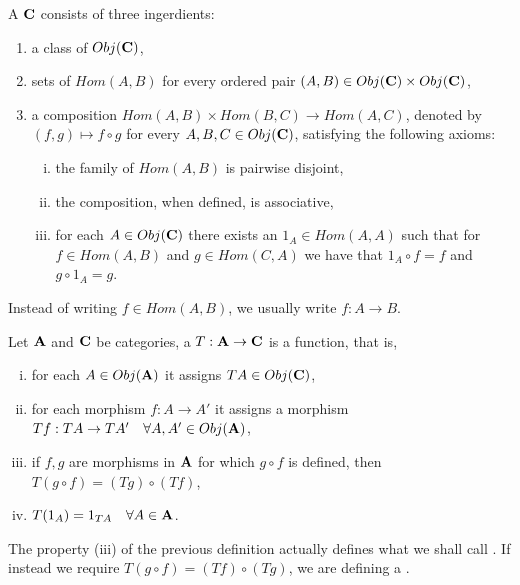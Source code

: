 \documentclass[../1.tex]{subfiles}
\begin{document}
    \begin{defn}
        A  $\textbf{C}$ consists of three ingerdients:
        \begin{enumerate}[1.]
            \item a class of  $Obj(\textbf{C})$,
            \item sets of  $Hom(A,B)$ for every ordered pair $(A,B) \in Obj(\textbf{C}) \times Obj(\textbf{C})$,
            \item a composition $Hom(A,B) \times Hom(B,C) \to Hom(A,C)$, denoted by $(f,g) \mapsto f \circ g$ for every $A,B,C \in Obj(\textbf{C})$, satisfying the following axioms:
            \begin{enumerate}[(i)]
                \item the family of $Hom(A,B)$ is pairwise disjoint,
                \item the composition, when defined, is associative,
                \item for each $A \in Obj(\textbf{C})$ there exists an  $1_A \in Hom(A,A)$ such that for $f \in Hom(A,B)$ and $g \in Hom(C,A)$
                      we have that $1_A \circ f = f$ and $g \circ 1_A = g$.
            \end{enumerate}
        \end{enumerate}
    \end{defn}

    Instead of writing $f \in Hom(A,B)$, we usually write $f : A \to B$. 

    \begin{defn}
        Let $\textbf{A}$ and $\textbf{C}$ be categories, a  $T : \textbf{A} \to \textbf{C}$ is a function, that is, 
        \begin{enumerate}[(i)]
            \item for each $A \in Obj(\textbf{A})$ it assigns $TA \in Obj(\textbf{C})$,
            \item for each morphism $f:A \to A'$ it assigns a morphism $Tf: TA \to TA' \quad \forall A,A' \in Obj(\textbf{A})$,
            \item if $f,g$ are morphisms in $\textbf{A}$ for which $g \circ f$ is defined, then $T(g \circ f) = (Tg) \circ (Tf)$,
            \item $T(1_A)= 1_{TA} \quad \forall A \in \textbf{A}$.
        \end{enumerate}
    \end{defn}

    The property (iii) of the previous definition actually defines what we shall call .
    If instead we require $T(g \circ f) = (Tf) \circ (Tg)$, we are defining a .
\end{document}
